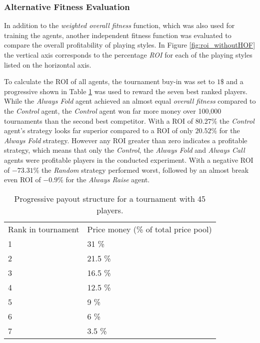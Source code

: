 \subsubsection{Alternative Fitness Evaluation}
 In addition to the \textit{weighted overall fitness} function, which was also used for training the agents, another independent fitness function was evaluated to compare the overall profitability of playing styles. In Figure \ref{fig:roi_withoutHOF} the vertical axis corresponds to the percentage \textit{ROI} for each of the playing styles listed on the horizontal axis.\par
 To calculate the ROI of all agents, the tournament buy-in was set to $1\$$ and a progressive  shown in Table \ref{tab:payout_structure} was used to reward the seven best ranked players. While the \textit{Always Fold} agent achieved an almost equal \textit{overall fitness} compared to the \textit{Control} agent, the \textit{Control} agent won far more money over 100,000 tournaments than the second best competitor. With a ROI of $80.27\%$ the \textit{Control} agent's strategy looks far superior compared to a ROI of only $20.52\%$ for the \textit{Always Fold} strategy. However any ROI greater than zero indicates a profitable strategy, which means that only the \textit{Control}, the \textit{Always Fold} and \textit{Always Call} agents were profitable players in the conducted experiment. With a negative ROI of $-73.31\%$ the \textit{Random} strategy performed worst, followed by an almost break even ROI of $-0.9\%$ for the \textit{Always Raise} agent. 
 \begin{table}[]
\begin{tabular}{|l||l|}
\hline
\multicolumn{1}{|c||}{Rank in tournament} & \multicolumn{1}{c|}{Price money (\% of total price pool)} \\ \hhline{=#=}
1 & 31 \% \ \\ \hline
2 & 21.5 \% \ \\ \hline
3 & 16.5 \% \ \\ \hline
4 & 12.5 \% \ \\ \hline
5 & 9 \% \ \\ \hline
6 & 6 \% \ \\ \hline
7 & 3.5 \% \ \\ \hline
\end{tabular}
\centering
\caption{Progressive payout structure for a tournament with 45 players.}
\label{tab:payout_structure}
\end{table} \ \\
